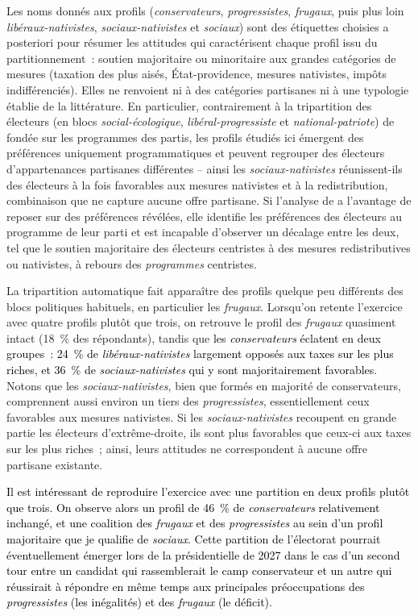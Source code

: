 \documentclass[12pt,french]{article}
\newcommand{\blue}[1]{\textcolor{black}{#1}} %
\begin{document}
Les noms donnés aux profils (\textit{conservateurs}, \textit{progressistes}, \textit{frugaux}, puis plus loin \textit{libéraux-nativistes}, \textit{sociaux-nativistes} et \textit{sociaux}) sont des étiquettes choisies a posteriori pour résumer les attitudes qui caractérisent chaque profil issu du partitionnement~: soutien majoritaire ou minoritaire aux grandes catégories de mesures (taxation des plus aisés, État-providence, mesures nativistes, impôts indifférenciés). Elles ne renvoient ni à des catégories partisanes ni à une typologie établie de la littérature. En particulier, contrairement à la tripartition des électeurs (en blocs \textit{social-écologique}, \textit{libéral-progressiste} et \textit{national-patriote}) de \cite{cage_histoire_2023} fondée sur les programmes des partis, les profils étudiés ici émergent des préférences uniquement programmatiques et peuvent regrouper des électeurs d'appartenances partisanes différentes -- ainsi les \textit{sociaux-nativistes} réunissent-ils des électeurs à la fois favorables aux mesures nativistes et à la redistribution, combinaison que ne capture aucune offre partisane. Si l'analyse de \cite{cage_histoire_2023} a l'avantage de reposer sur des préférences révélées, elle identifie les préférences des électeurs au programme de leur parti et est incapable d'observer un décalage entre les deux, tel que le soutien majoritaire des électeurs centristes à des mesures redistributives ou nativistes, à rebours des \textit{programmes} centristes.

La tripartition automatique fait apparaître des profils quelque peu différents des blocs politiques habituels, en particulier les \textit{frugaux}. Lorsqu'on retente l'exercice avec quatre profils plutôt que trois, on retrouve le profil des \textit{frugaux} quasiment intact (18~\% des répondants), tandis que \blue{les \textit{conservateurs} éclatent en deux groupes~: 24~\% de \textit{libéraux-nativistes} largement opposés aux taxes sur les plus riches, et 36~\% de \textit{sociaux-nativistes} qui y sont majoritairement favorables}. Notons que les \textit{sociaux-nativistes}, bien que formés en majorité de conservateurs, comprennent aussi environ un tiers des \textit{progressistes}, essentiellement ceux favorables aux mesures nativistes. Si les \textit{sociaux-nativistes} recoupent en grande partie les électeurs d'extrême-droite, %
ils sont plus favorables que ceux-ci aux taxes sur les plus riches~; ainsi, leurs attitudes ne correspondent à aucune offre partisane existante.

\blue{Il est intéressant de reproduire l'exercice avec une partition en deux profils plutôt que trois. On observe alors un profil de 46~\% de \textit{conservateurs} relativement inchangé, et une coalition des \textit{frugaux} et des \textit{progressistes} au sein d'un profil majoritaire que je qualifie de \textit{sociaux}. Cette partition de l'électorat pourrait éventuellement émerger lors de la présidentielle de 2027 dans le cas d'un second tour entre un candidat qui rassemblerait le camp conservateur et un autre qui réussirait à %
répondre en même temps aux principales préoccupations des \textit{progressistes} (les inégalités) et des \textit{frugaux} (le déficit). }
\end{document}
